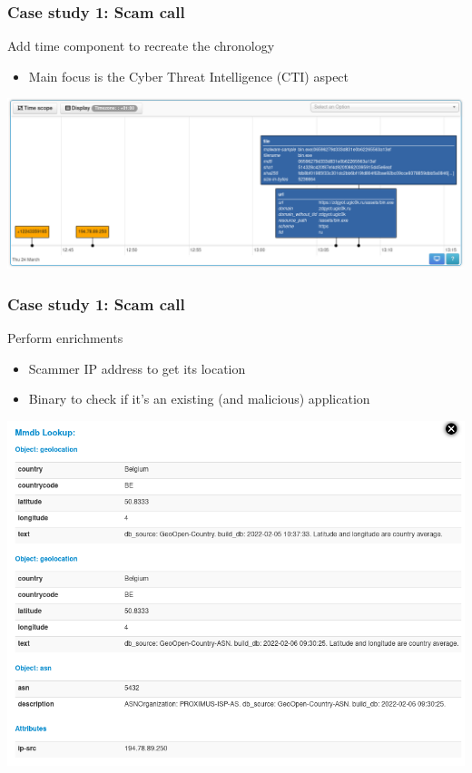\begin{frame}
    \frametitle{Case study 1: Scam call}
    Add time component to recreate the chronology
    \begin{itemize}
        \item Main focus is the Cyber Threat Intelligence (CTI) aspect
    \end{itemize}
    \includegraphics[width=1.0\linewidth]{pictures/case1/timeline.png}
\end{frame}

\begin{frame}
    \frametitle{Case study 1: Scam call}
    Perform enrichments
    \begin{itemize}
        \item Scammer IP address to get its location
        \item Binary to check if it's an existing (and malicious) application
    \end{itemize}
    \includegraphics[width=1.0\linewidth]{pictures/case1/enrichment.png}
\end{frame}

